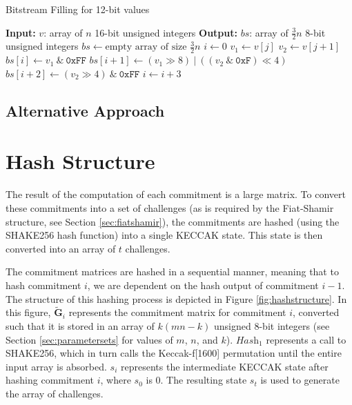 \documentclass[11pt,a4paper]{report}
\theoremstyle{definition}
\begin{document}
\begin{algorithm}
  \label{alg:bitstreamfilling}
  \caption{Bitstream Filling for 12-bit values}
  \begin{algorithmic}
    \State \textbf{Input:} $v$: array of $n$ 16-bit unsigned integers
    \State \textbf{Output:} $bs$: array of $\frac{3}{2}n$ 8-bit unsigned integers
    \State $bs \gets \text{empty array of size } \frac{3}{2}n$
    \State $i \gets 0$
      \State $v_1 \gets v[j]$
      \State $v_2 \gets v[j + 1]$
      \State $bs[i] \gets v_1 ~\&~ \texttt{0xFF}$
      \State $bs[i + 1] \gets (v_1 \gg 8) ~|~ ((v_2 ~\&~ \texttt{0xF}) \ll 4)$
      \State $bs[i + 2] \gets (v_2 \gg 4) ~\&~ \texttt{0xFF}$
      \State $i \gets i + 3$
    \EndFor
  \end{algorithmic}
\end{algorithm}

\subsection{Alternative Approach}

\section{Hash Structure}
\label{sec:hashfunctionoptimization}
The result of the computation of each commitment is a large matrix. To convert these commitments into a set of challenges (as is required by the Fiat-Shamir structure, see Section \ref{sec:fiatshamir}), the commitments are hashed (using the SHAKE256 hash function) into a single KECCAK state. This state is then converted into an array of $t$ challenges.

The commitment matrices are hashed in a sequential manner, meaning that to hash commitment $i$, we are dependent on the hash output of commitment $i - 1$. The structure of this hashing process is depicted in Figure \ref{fig:hashstructure}. In this figure, $\tilde{\textbf{G}}_i$ represents the commitment matrix for commitment $i$, converted such that it is stored in an array of $k(mn - k)$ unsigned 8-bit integers (see Section \ref{sec:parametersets} for values of $m$, $n$, and $k$). $\textit{Hash}_1$ represents a call to SHAKE256, which in turn calls the Keccak-f[1600] permutation until the entire input array is absorbed. $s_i$ represents the intermediate KECCAK state after hashing commitment $i$, where $s_0$ is 0. The resulting state $s_t$ is used to generate the array of challenges.
\end{document}
